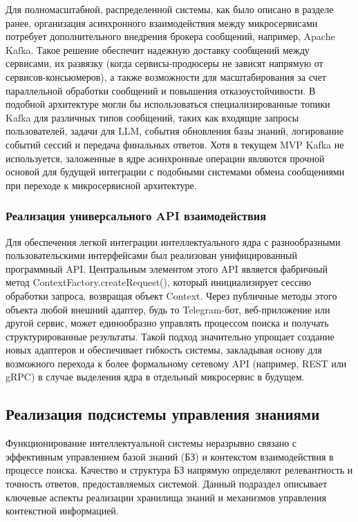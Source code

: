 Для полномасштабной, распределенной системы, как было описано в разделе ранее, организация асинхронного взаимодействия между микросервисами потребует дополнительного внедрения брокера сообщений, например, Apache Kafka. Такое решение обеспечит надежную доставку сообщений между сервисами, их развязку (когда сервисы-продюсеры не зависят напрямую от сервисов-консьюмеров), а также возможности для масштабирования за счет параллельной обработки сообщений и повышения отказоустойчивости. В подобной архитектуре могли бы использоваться специализированные топики Kafka для различных типов сообщений, таких как входящие запросы пользователей, задачи для LLM, события обновления базы знаний, логирование событий сессий и передача финальных ответов. Хотя в текущем MVP Kafka не используется, заложенные в ядре асинхронные операции являются прочной основой для будущей интеграции с подобными системами обмена сообщениями при переходе к микросервисной архитектуре.

\subsubsection{Реализация универсального API взаимодействия}

Для обеспечения легкой интеграции интеллектуального ядра с разнообразными пользовательскими интерфейсами был реализован унифицированный программный API. Центральным элементом этого API является фабричный метод ContextFactory.createRequest(), который инициализирует сессию обработки запроса, возвращая объект Context. Через публичные методы этого объекта любой внешний адаптер, будь то Telegram-бот, веб-приложение или другой сервис, может единообразно управлять процессом  поиска и получать структурированные результаты. Такой подход значительно упрощает создание новых адаптеров и обеспечивает гибкость системы, закладывая основу для возможного перехода к более формальному сетевому API (например, REST или gRPC) в случае выделения ядра в отдельный микросервис в будущем.

\subsection{Реализация подсистемы управления знаниями}

Функционирование интеллектуальной системы неразрывно связано с эффективным управлением базой знаний (БЗ) и контекстом взаимодействия в процессе поиска. Качество и структура БЗ напрямую определяют релевантность и точность ответов, предоставляемых системой. Данный подраздел описывает ключевые аспекты реализации хранилища знаний и механизмов управления контекстной информацией.

